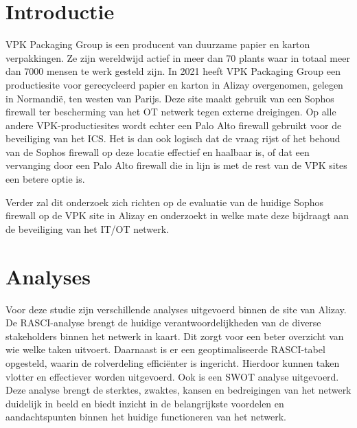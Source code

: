 \documentclass[a0,portrait]{hogent-poster}
\begin{document}
\begin{multicols}{2}

\section{Introductie}
VPK Packaging Group is een producent van duurzame papier en karton verpakkingen. Ze zijn wereldwijd actief in meer dan 70 plants waar in totaal meer dan 7000 mensen te werk gesteld zijn. In 2021 heeft VPK Packaging Group een productiesite voor gerecycleerd papier en karton in Alizay overgenomen, gelegen in Normandië, ten westen van Parijs. Deze site maakt gebruik van een Sophos firewall ter bescherming van het OT netwerk tegen externe dreigingen. Op alle andere VPK-productiesites wordt echter een Palo Alto firewall gebruikt voor de beveiliging van het ICS. Het is dan ook logisch dat de vraag rijst of het behoud van de Sophos firewall op deze locatie effectief en haalbaar is, of dat een vervanging door een Palo Alto firewall die in lijn is met de rest van de VPK sites een betere optie is.

Verder zal dit onderzoek zich richten op de evaluatie van de huidige Sophos firewall op de VPK site in Alizay en onderzoekt in welke mate deze bijdraagt aan de beveiliging van het IT/OT netwerk.
\newline

\begin{center}
    \captionsetup{type=figure}
\end{center}


\section{Analyses}
Voor deze studie zijn verschillende analyses uitgevoerd binnen de site van Alizay. De RASCI-analyse brengt de huidige verantwoordelijkheden van de diverse stakeholders binnen het netwerk in kaart. Dit zorgt voor een beter overzicht van wie welke taken uitvoert. Daarnaast is er een geoptimaliseerde RASCI-tabel opgesteld, waarin de rolverdeling efficiënter is ingericht. Hierdoor kunnen taken vlotter en effectiever worden uitgevoerd. Ook is een SWOT analyse uitgevoerd. Deze analyse brengt de sterktes, zwaktes, kansen en bedreigingen van het netwerk duidelijk in beeld en biedt inzicht in de belangrijkste voordelen en aandachtspunten binnen het huidige functioneren van het netwerk.


\end{multicols}
\end{document}
